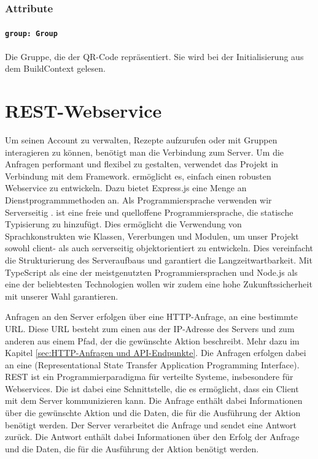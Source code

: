 \documentclass{entwurfsheft}
\begin{document}
\begin{sloppypar}
\subsubsection*{Attribute}
\paragraph{\texttt{group: Group}}
Die Gruppe, die der QR-Code repräsentiert. Sie wird bei der Initialisierung aus dem \Gls{BuildContext} gelesen.

\newpage
\section{REST-Webservice}
Um seinen Account zu verwalten, Rezepte aufzurufen oder mit Gruppen interagieren zu können, benötigt man die Verbindung zum Server.
Um die Anfragen performant und flexibel zu gestalten, verwendet das Projekt  in Verbindung mit dem  Framework.
 ermöglicht es, einfach einen robusten Webservice zu entwickeln. Dazu bietet Express.js eine Menge an Dienstprogrammmethoden an.
Als Programmiersprache verwenden wir Serverseitig .  ist eine freie und quelloffene Programmiersprache, die statische Typisierung zu  hinzufügt.
Dies ermöglicht die Verwendung von Sprachkonstrukten wie Klassen, Vererbungen und Modulen, um unser Projekt sowohl client- als auch serverseitig objektorientiert zu entwickeln.
Dies vereinfacht die Strukturierung des Serveraufbaus und garantiert die Langzeitwartbarkeit. Mit TypeScript als eine der meistgenutzten Programmiersprachen und Node.js als eine der beliebtesten Technologien wollen wir zudem eine hohe Zukunftssicherheit mit unserer Wahl garantieren.

Anfragen an den Server erfolgen über eine HTTP-Anfrage, an eine bestimmte URL. Diese URL besteht zum einen aus der IP-Adresse des Servers und zum anderen aus einem Pfad, der die gewünschte Aktion beschreibt. Mehr dazu im Kapitel \ref{sec:HTTP-Anfragen und API-Endpunkte}.
Die Anfragen erfolgen dabei an eine  (Representational State Transfer Application Programming Interface). REST ist ein Programmierparadigma für verteilte Systeme, insbesondere für Webservices.
Die  ist dabei eine Schnittstelle, die es ermöglicht, dass ein Client mit dem Server kommunizieren kann.
Die Anfrage enthält dabei Informationen über die gewünschte Aktion und die Daten, die für die Ausführung der Aktion benötigt werden.
Der Server verarbeitet die Anfrage und sendet eine Antwort zurück.
Die Antwort enthält dabei Informationen über den Erfolg der Anfrage und die Daten, die für die Ausführung der Aktion benötigt werden.


\end{sloppypar}
\end{document}
